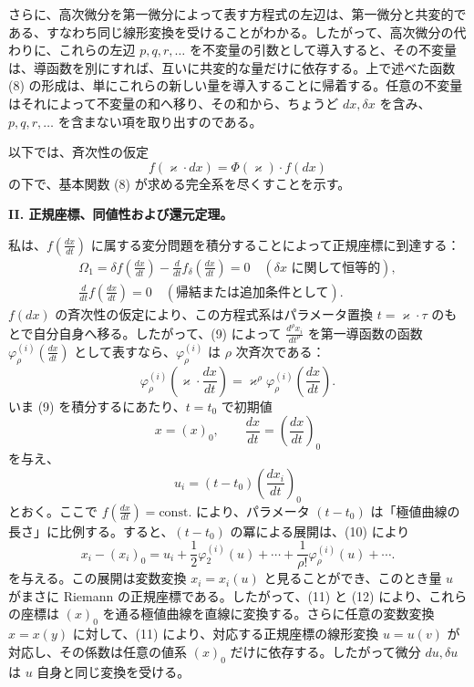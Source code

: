 さらに、高次微分を第一微分によって表す方程式の左辺は、第一微分と共変的である、すなわち同じ線形変換を受けることがわかる。したがって、高次微分の代わりに、これらの左辺 \(p,q,r,\ldots\) を不変量の引数として導入すると、その不変量は、導函数を別にすれば、互いに共変的な量だけに依存する。上で述べた函数 (8) の形成は、単にこれらの新しい量を導入することに帰着する。任意の不変量はそれによって不変量の和へ移り、その和から、ちょうど \(dx,\delta x\) を含み、\(p,q,r,\ldots\) を含まない項を取り出すのである。

以下では、斉次性の仮定
\[
f(\varkappa\cdot dx)=\Phi(\varkappa)\cdot f(dx)
\]
の下で、基本関数 (8) が求める完全系を尽くすことを示す。

\begin{center}
\textbf{II. 正規座標、同値性および還元定理。}
\end{center}

私は、\(f\!\left(\frac{dx}{dt}\right)\) に属する変分問題を積分することによって正規座標に到達する：
\begin{equation}
\begin{gathered}
\Omega_1=\delta f\!\left(\frac{dx}{dt}\right)
-\frac{d}{dt}f_\delta\!\left(\frac{dx}{dt}\right)=0
\quad(\text{\(\delta x\) に関して恒等的}),\\
\frac{d}{dt}f\!\left(\frac{dx}{dt}\right)=0
\quad(\text{帰結または追加条件として}).
\end{gathered}
\tag{9}
\end{equation}
\(f(dx)\) の斉次性の仮定により、この方程式系はパラメータ置換 \(t=\varkappa\cdot\tau\) のもとで自分自身へ移る。したがって、(9) によって \(\frac{d^\rho x_i}{dt^\rho}\) を第一導函数の函数
\(\varphi_\rho^{(i)}\!\left(\frac{dx}{dt}\right)\) として表すなら、\(\varphi_\rho^{(i)}\) は \(\rho\) 次斉次である：
\begin{equation}
\varphi_\rho^{(i)}\!\left(\varkappa\cdot\frac{dx}{dt}\right)
=\varkappa^\rho\varphi_\rho^{(i)}\!\left(\frac{dx}{dt}\right).
\tag{10}
\end{equation}
いま (9) を積分するにあたり、\(t=t_0\) で初期値
\[
x=(x)_0,\qquad \frac{dx}{dt}=\left(\frac{dx}{dt}\right)_0
\]
を与え、
\begin{equation}
u_i=(t-t_0)\left(\frac{dx_i}{dt}\right)_0
\tag{11}
\end{equation}
とおく。ここで \(f\!\left(\frac{dx}{dt}\right)=\mathrm{const.}\) により、パラメータ \((t-t_0)\) は「極値曲線の長さ」に比例する。すると、\((t-t_0)\) の冪による展開は、(10) により
\begin{equation}
x_i-(x_i)_0=u_i+\frac12\varphi_2^{(i)}(u)+\cdots+
\frac{1}{\rho!}\varphi_\rho^{(i)}(u)+\cdots .
\tag{12}
\end{equation}
を与える。この展開は変数変換 \(x_i=x_i(u)\) と見ることができ、このとき量 \(u\) がまさに Riemann の正規座標である。したがって、(11) と (12) により、これらの座標は \((x)_0\) を通る極値曲線を直線に変換する。さらに任意の変数変換 \(x=x(y)\) に対して、(11) により、対応する正規座標の線形変換 \(u=u(v)\) が対応し、その係数は任意の値系 \((x)_0\) だけに依存する。したがって微分 \(du,\delta u\) は \(u\) 自身と同じ変換を受ける。

